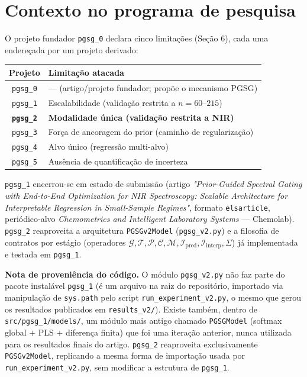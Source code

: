 \documentclass[11pt,a4paper]{article}
\begin{document}
\tableofcontents

\section{Contexto no programa de pesquisa}

O projeto fundador \texttt{pgsg\_0} declara cinco limitações (Seção 6), cada uma endereçada por um projeto derivado:

\begin{center}
\begin{tabular}{cl}
\toprule
Projeto & Limitação atacada \\
\midrule
\texttt{pgsg\_0} & --- (artigo/projeto fundador; propõe o mecanismo PGSG) \\
\texttt{pgsg\_1} & Escalabilidade (validação restrita a $n=60$--$215$) \\
\textbf{\texttt{pgsg\_2}} & \textbf{Modalidade única (validação restrita a NIR)} \\
\texttt{pgsg\_3} & Força de ancoragem do prior (caminho de regularização) \\
\texttt{pgsg\_4} & Alvo único (regressão multi-alvo) \\
\texttt{pgsg\_5} & Ausência de quantificação de incerteza \\
\bottomrule
\end{tabular}
\end{center}

\texttt{pgsg\_1} encerrou-se em estado de submissão (artigo \emph{"Prior-Guided Spectral Gating with End-to-End Optimization for NIR Spectroscopy: Scalable Architecture for Interpretable Regression in Small-Sample Regimes"}, formato \texttt{elsarticle}, periódico-alvo \emph{Chemometrics and Intelligent Laboratory Systems} --- Chemolab). \texttt{pgsg\_2} reaproveita a arquitetura \texttt{PGSGv2Model} (\texttt{pgsg\_v2.py}) e a filosofia de contratos por estágio (operadores $\mathcal{G}, \mathcal{T}, \mathcal{P}, \mathcal{C}, \mathcal{M}, \mathcal{I}_{\text{pred}}, \mathcal{I}_{\text{interp}}, \Sigma$) já implementada e testada em \texttt{pgsg\_1}.

\textbf{Nota de proveniência do código.} O módulo \texttt{pgsg\_v2.py} não faz parte do pacote instalável \texttt{pgsg\_1} (é um arquivo na raiz do repositório, importado via manipulação de \texttt{sys.path} pelo script \texttt{run\_experiment\_v2.py}, o mesmo que gerou os resultados publicados em \texttt{results\_v2/}). Existe também, dentro de \texttt{src/pgsg\_1/models/}, um módulo mais antigo chamado \texttt{PGSGModel} (softmax global + PLS + diferença finita) que foi uma iteração anterior, nunca utilizada para os resultados finais do artigo. \texttt{pgsg\_2} reaproveita exclusivamente \texttt{PGSGv2Model}, replicando a mesma forma de importação usada por \texttt{run\_experiment\_v2.py}, sem modificar a estrutura de \texttt{pgsg\_1}.
\end{document}
